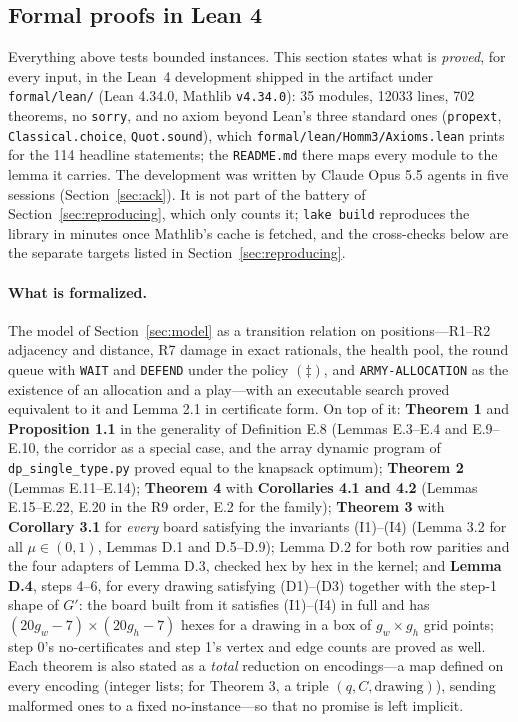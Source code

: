 \documentclass[11pt,a4paper]{article}
\theoremstyle{plain}
\theoremstyle{definition}
\theoremstyle{plain}
\theoremstyle{definition}
\theoremstyle{remark}
\newcommand{\src}[1]{\texttt{#1}}
\begin{document}
\subsection{Formal proofs in Lean 4}\label{sec:lean}

Everything above tests bounded instances. This section states what is \emph{proved}, for
every input, in the Lean~4 development shipped in the artifact under \src{formal/lean/}
(Lean 4.34.0, Mathlib \src{v4.34.0}): 35 modules, 12033 lines, 702 theorems, no
\src{sorry}, and no axiom beyond Lean's three standard ones (\src{propext},
\src{Classical.choice}, \src{Quot.sound}), which
\src{formal/lean/Homm3/\allowbreak Axioms.lean} prints for the 114 headline statements; the
\src{README.md} there maps every module to the lemma it carries. The development was
written by Claude Opus 5.5 agents in five sessions (Section~\ref{sec:ack}). It is not part
of the battery of Section~\ref{sec:reproducing}, which only counts it; \src{lake build}
reproduces the library in minutes once Mathlib's cache is fetched, and the cross-checks below
are the separate targets listed in Section~\ref{sec:reproducing}.

\paragraph{What is formalized.} The model of Section~\ref{sec:model} as a transition
relation on positions---R1--R2 adjacency and distance, R7 damage in exact rationals, the
health pool, the round queue with \src{WAIT} and \src{DEFEND} under the policy
$(\ddagger)$, and \src{ARMY-ALLOCATION} as the existence of an allocation and a play---with
an executable search proved equivalent to it and Lemma 2.1 in certificate form. On top of
it: \textbf{Theorem 1} and \textbf{Proposition 1.1} in the generality of Definition E.8
(Lemmas E.3--E.4 and E.9--E.10, the corridor as a special case, and the array dynamic
program of \src{dp\_single\_type.py} proved equal to the knapsack optimum);
\textbf{Theorem 2} (Lemmas E.11--E.14); \textbf{Theorem 4} with \textbf{Corollaries 4.1
and 4.2} (Lemmas E.15--E.22, E.20 in the R9 order, E.2 for the family); \textbf{Theorem 3}
with \textbf{Corollary 3.1} for \emph{every} board satisfying the invariants (I1)--(I4)
(Lemma 3.2 for all $\mu\in(0,1)$, Lemmas D.1 and D.5--D.9); Lemma D.2 for both row
parities and the four adapters of Lemma D.3, checked hex by hex in the kernel; and
\textbf{Lemma D.4}, steps 4--6, for every drawing satisfying (D1)--(D3) together with the
step-1 shape of $G'$: the board built from it satisfies (I1)--(I4) in full and has
$(20g_w-7)\times(20g_h-7)$ hexes for a drawing in a box of $g_w\times g_h$ grid points; step 0's
no-certificates and step 1's vertex and edge counts are proved as well. Each theorem is
also stated as a \emph{total} reduction on encodings---a map defined on every encoding
(integer lists; for Theorem 3, a triple $(q, C, \text{drawing})$), sending malformed ones to a
fixed no-instance---so that no promise is left implicit.
\end{document}
